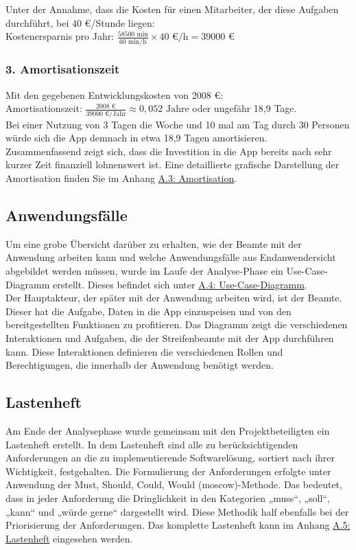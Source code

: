 \documentclass[a4paper,12pt]{article}
\begin{document}
Unter der Annahme, dass die Kosten für einen Mitarbeiter, der diese Aufgaben durchführt, bei 40 €/Stunde liegen:\\
Kostenersparnis pro Jahr: $\frac{58500 \text{ min}}{60 \text{ min/h}} \times 40 \text{ €/h} = 39000 \text{ €}$

\subsubsection*{3. Amortisationszeit}
Mit den gegebenen Entwicklungskosten von 2008 €:\\
Amortisationszeit: $\frac{2008 \text{ €}}{39000 \text{ €/Jahr}} \approx 0,052 \text{ Jahre}$ oder ungefähr 18,9 Tage.\\
Bei einer Nutzung von 3 Tagen die Woche und 10 mal am Tag durch 30 Personen würde sich die App demnach in etwa 18,9 Tagen amortisieren.\\
Zusammenfassend zeigt sich, dass die Investition in die App bereits nach sehr kurzer Zeit finanziell lohnenswert ist. Eine detaillierte grafische Darstellung der Amortisation finden Sie im Anhang \hyperref[sec:amortisation]{A.3: Amortisation}.




\subsection{Anwendungsfälle}
\label{sec:anwendungsfälle}
Um eine grobe Übersicht darüber zu erhalten, wie der Beamte mit der Anwendung arbeiten kann und welche Anwendungsfälle aus Endanwendersicht abgebildet werden müssen, wurde im Laufe der Analyse-Phase ein Use-Case-Diagramm erstellt. Dieses befindet sich unter \hyperref[sec:use-case-diagramm]{A.4: Use-Case-Diagramm}.
\\
Der Hauptakteur, der später mit der Anwendung arbeiten wird, ist der Beamte. Dieser hat die Aufgabe, Daten in die App einzuspeisen und von den bereitgestellten Funktionen zu profitieren. Das Diagramm zeigt die verschiedenen Interaktionen und Aufgaben, die der Streifenbeamte mit der App durchführen kann. Diese Interaktionen definieren die verschiedenen Rollen und Berechtigungen, die innerhalb der Anwendung benötigt werden.

\subsection{Lastenheft}
Am Ende der Analysephase wurde gemeinsam mit den Projektbeteiligten ein Lastenheft erstellt. In dem Lastenheft sind alle zu berücksichtigenden Anforderungen an die zu implementierende Softwarelösung, sortiert nach ihrer Wichtigkeit, festgehalten. Die Formulierung der Anforderungen erfolgte unter Anwendung der Must, Should, Could, Would (\acrshort{moscow})-Methode. Das bedeutet, dass in jeder Anforderung die Dringlichkeit in den Kategorien „muss“, „soll“, „kann“ und „würde gerne“ dargestellt wird. Diese Methodik half ebenfalls bei der Priorisierung der Anforderungen. Das komplette Lastenheft kann im Anhang \hyperref[sec:lastenheft]{A.5: Lastenheft} eingesehen werden.
\end{document}
